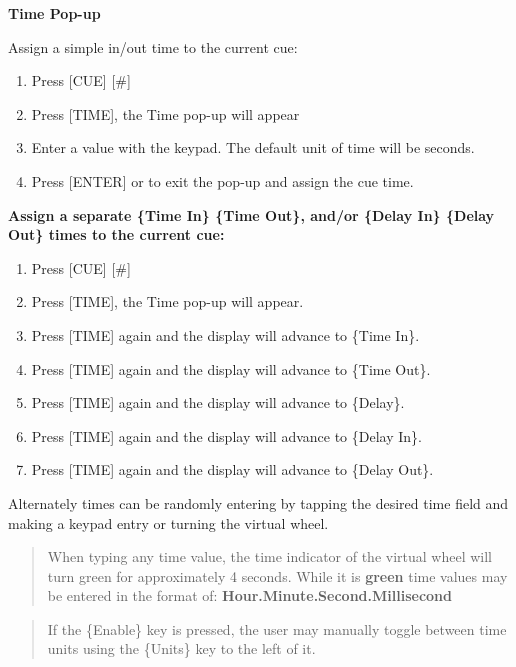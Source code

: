 \documentclass[
]{article}
\begin{document}
\textbf{Time Pop-up}

Assign a simple in/out time to the current cue:

\begin{enumerate}
\def\labelenumi{\arabic{enumi}.}
\item
  Press {[}CUE{]} {[}\#{]}
\item
  Press {[}TIME{]}, the Time pop-up will appear
\item
  Enter a value with the keypad. The default unit of time will be seconds.
\item
  Press {[}ENTER{]} or \href{image.png}{} to exit the pop-up and assign the cue time.
\end{enumerate}

\textbf{Assign a separate \{Time In\} \{Time Out\}, and/or \{Delay In\} \{Delay Out\} times to the current cue:}

\begin{enumerate}
\def\labelenumi{\arabic{enumi}.}
\item
  Press {[}CUE{]} {[}\#{]}
\item
  Press {[}TIME{]}, the Time pop-up will appear.
\item
  Press {[}TIME{]} again and the display will advance to \{Time In\}.
\item
  Press {[}TIME{]} again and the display will advance to \{Time Out\}.
\item
  Press {[}TIME{]} again and the display will advance to \{Delay\}.
\item
  Press {[}TIME{]} again and the display will advance to \{Delay In\}.
\item
  Press {[}TIME{]} again and the display will advance to \{Delay Out\}.
\end{enumerate}

Alternately times can be randomly entering by tapping the desired time field and making a keypad entry or turning the virtual wheel.

\begin{quote}
When typing any time value, the time indicator of the virtual wheel will turn green for approximately 4 seconds. While it is {\textbf{green}} time values may be entered in the format of: \textbf{Hour.Minute.Second.Millisecond}
\end{quote}

\begin{quote}
If the \{Enable\} key is pressed, the user may manually toggle between time units using the \{Units\} key to the left of it.
\end{quote}
\end{document}
